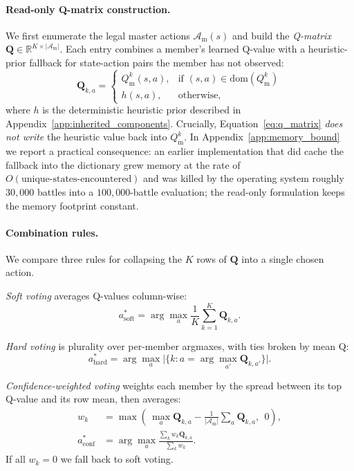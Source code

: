 \paragraph{Read-only Q-matrix construction.}
We first enumerate the legal master actions $\mathcal{A}_{\text{m}}(s)$
and build the \emph{Q-matrix}
$\mathbf{Q} \in \mathbb{R}^{K \times |\mathcal{A}_{\text{m}}|}$. Each entry
combines a member's learned Q-value with a heuristic-prior fallback for
state-action pairs the member has not observed:
\begin{equation}
  \mathbf{Q}_{k, a} =
  \begin{cases}
    Q^k_{\text{m}}(s, a), & \text{if } (s, a) \in \mathrm{dom}(Q^k_{\text{m}}) \\
    h(s, a),              & \text{otherwise,}
  \end{cases}
  \label{eq:q_matrix}
\end{equation}
where $h$ is the deterministic heuristic prior described in
Appendix~\ref{app:inherited_components}. Crucially,
Equation~\ref{eq:q_matrix} \emph{does not write} the heuristic value back
into $Q^k_{\text{m}}$. In Appendix~\ref{app:memory_bound} we report a
practical consequence: an earlier implementation that did cache the
fallback into the dictionary grew memory at the rate of
$O(\text{unique-states-encountered})$ and was killed by the operating
system roughly $30{,}000$ battles into a $100{,}000$-battle evaluation;
the read-only formulation keeps the memory footprint constant.

\paragraph{Combination rules.}
We compare three rules for collapsing the $K$ rows of $\mathbf{Q}$ into a
single chosen action.

\emph{Soft voting} averages Q-values column-wise:
\begin{equation}
  a^*_{\text{soft}} = \arg\max_{a}
                       \frac{1}{K} \sum_{k=1}^{K} \mathbf{Q}_{k, a}.
\end{equation}

\emph{Hard voting} is plurality over per-member argmaxes, with ties broken
by mean Q:
\begin{equation}
  a^*_{\text{hard}} = \arg\max_{a}
    \Big|\big\{ k : a = \arg\max_{a'} \mathbf{Q}_{k, a'}\big\}\Big|.
\end{equation}

\emph{Confidence-weighted voting} weights each member by the spread between
its top Q-value and its row mean, then averages:
\begin{align}
  w_k &= \max\!\left(\, \max_a \mathbf{Q}_{k, a}
        - \tfrac{1}{|\mathcal{A}_{\text{m}}|} \sum_a \mathbf{Q}_{k, a},\ \ 0\right), \\
  a^*_{\text{conf}} &=
    \arg\max_{a} \frac{\sum_k w_k \mathbf{Q}_{k, a}}{\sum_k w_k}.
\end{align}
If all $w_k = 0$ we fall back to soft voting.

